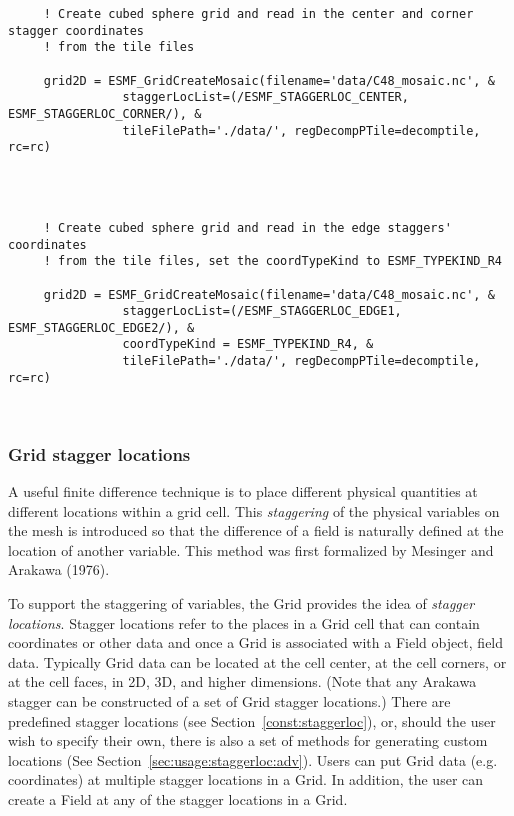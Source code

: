 
 \begin{verbatim}
     ! Create cubed sphere grid and read in the center and corner stagger coordinates
     ! from the tile files

     grid2D = ESMF_GridCreateMosaic(filename='data/C48_mosaic.nc', &
                staggerLocList=(/ESMF_STAGGERLOC_CENTER, ESMF_STAGGERLOC_CORNER/), &
                tileFilePath='./data/', regDecompPTile=decomptile, rc=rc)

 
\end{verbatim}
 

 \begin{verbatim}

     ! Create cubed sphere grid and read in the edge staggers' coordinates
     ! from the tile files, set the coordTypeKind to ESMF_TYPEKIND_R4

     grid2D = ESMF_GridCreateMosaic(filename='data/C48_mosaic.nc', &
                staggerLocList=(/ESMF_STAGGERLOC_EDGE1, ESMF_STAGGERLOC_EDGE2/), &
                coordTypeKind = ESMF_TYPEKIND_R4, &
                tileFilePath='./data/', regDecompPTile=decomptile, rc=rc)

 
\end{verbatim}
 

  \subsubsection{Grid stagger locations}
  \label{sec:usage:staggerloc}
  
   A useful finite difference technique is to place different physical
   quantities at different locations within a grid cell. This
   {\em {staggering}} of the physical variables on the mesh is introduced so
   that the difference of a field is naturally defined at the location of
   another variable. This method was first formalized by Mesinger and Arakawa
   (1976).
  
   To support the staggering of variables, the Grid provides
   the idea of {\em stagger locations}.
   Stagger locations refer to the places in a Grid cell that
   can contain coordinates or other data and once a Grid is associated with a
   Field object, field data. Typically Grid data can be located
   at the cell center, at the cell corners, or at the cell faces, in 2D, 3D, and
   higher dimensions. (Note that any Arakawa stagger can be constructed
   of a set of Grid stagger locations.)  There are predefined stagger locations
   (see Section~\ref{const:staggerloc}), or,
   should the user wish to specify their own, there
   is also a set of methods for generating custom locations
   (See Section~\ref{sec:usage:staggerloc:adv}).
   Users can put Grid data (e.g. coordinates)
   at multiple stagger locations in a Grid. In addition, the user can create a Field
   at any of the stagger locations in a Grid.
  
